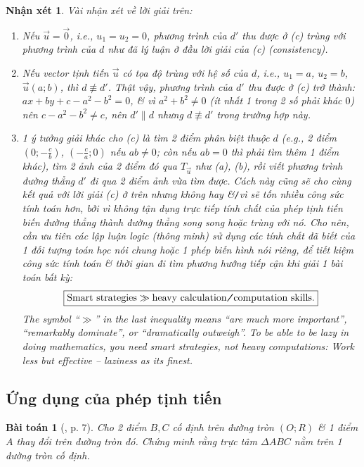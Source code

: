 \documentclass[oneside]{book}
\numberwithin{equation}{section}
\newtheorem{nhanxet}{Nhận xét}[section]
\newtheorem{baitoan}{Bài toán}[section]
\begin{document}
\begin{nhanxet}
	Vài nhận xét về lời giải trên:
	\begin{enumerate}
		\item Nếu $\vec{u} = \vec{0}$, i.e., $u_1 = u_2 = 0$, phương trình của $d'$ thu được ở (c) trùng với phương trình của $d$ như đã lý luận ở đầu lời giải của (c) (consistency).
		\item Nếu vector tịnh tiến $\vec{u}$  có tọa độ trùng với hệ số của $d$, i.e., $u_1 = a$, $u_2 = b$, $\vec{u}(a;b)$, thì $d\not\equiv d'$. Thật vậy, phương trình của $d'$ thu được ở (c) trở thành: $ax + by + c - a^2 - b^2 = 0$, \& vì $a^2 + b^2\ne 0$ (ít nhất 1 trong 2 số phải khác $0$) nên $c - a^2 - b^2\ne c$, nên $d'\parallel d$ nhưng $d\not\equiv d'$ trong trường hợp này.
		\item 1 ý tưởng giải khác cho (c) là tìm 2 điểm phân biệt thuộc $d$ (e.g., 2 điểm $\left(0;-\frac{c}{b}\right)$, $\left(-\frac{c}{a};0\right)$ nếu $ab\ne 0$; còn nếu $ab = 0$ thì phải tìm thêm 1 điểm khác), tìm 2 ảnh của 2 điểm đó qua $T_{\vec{u}}$ như (a), (b), rồi viết phương trình đường thẳng $d'$ đi qua 2 điểm ảnh vừa tìm được. Cách này cũng sẽ cho cùng kết quả với lời giải (c) ở trên nhưng không hay \&\emph{\texttt{/}}vì sẽ tốn nhiều công sức tính toán hơn, bởi vì không tận dụng trực tiếp tính chất của phép tịnh tiến biến đường thẳng thành đường thẳng song song hoặc trùng với nó. Cho nên, cần ưu tiên các lập luận logic (thông minh) sử dụng các tính chất đã biết của 1 đối tượng toán học nói chung hoặc 1 phép biến hình nói riêng, để tiết kiệm công sức tính toán \& thời gian đi tìm phương hướng tiếp cận khi giải 1 bài toán bất kỳ:
		\begin{align*}
			\boxed{\mbox{Smart strategies}\gg\mbox{heavy calculation\emph{\texttt{/}}computation skills.}}
		\end{align*}
		The symbol ``$\gg$'' in the last inequality means ``are much more important'', ``remarkably dominate'', or ``dramatically outweigh''. To be able to be lazy in doing mathematics, you need smart strategies, not heavy computations: Work less but effective -- laziness as its finest.
	\end{enumerate}
\end{nhanxet}

\subsection{Ứng dụng của phép tịnh tiến}

\begin{baitoan}[\cite{SGK_Toan_11_hinh_hoc_nang_cao}, p. 7]
	Cho 2 điểm $B,C$ cố định trên đường tròn $(O;R)$ \& 1 điểm $A$ thay đổi trên đường tròn đó. Chứng minh rằng trực tâm $\Delta ABC$ nằm trên 1 đường tròn cố định.
\end{baitoan}
\end{document}
